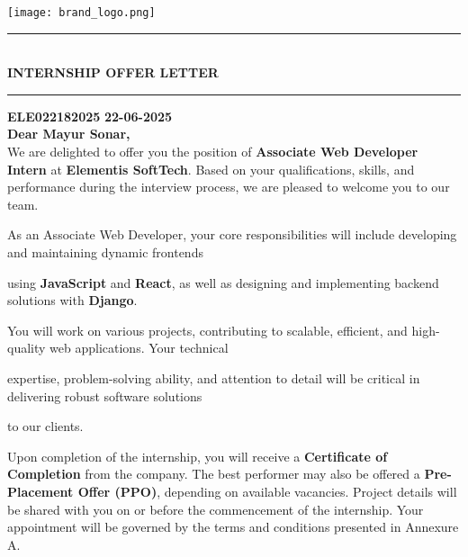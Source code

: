 \documentclass[a4paper,12pt]{article}
\begin{document}
\begin{center}
    \texttt{[image: brand\_logo.png]}\\
\end{center}

\begin{center}
    \vspace{0.5cm}
    \rule{\textwidth}{1pt} \\[0.5cm]
    {\LARGE \textbf{INTERNSHIP OFFER LETTER}} \\[0.5cm]
    \rule{\textwidth}{1pt}
\end{center}

\vspace{0.5cm}

\noindent
\textbf{ELE022182025} \hfill \textbf{22-06-2025} \\[0.5cm]

\noindent
\textbf{Dear Mayur Sonar,} \\

\vspace{0.5cm}
We are delighted to offer you the position of \textbf{Associate Web Developer Intern} at \textbf{Elementis SoftTech}. Based on your qualifications, skills, and performance during the interview process, we are pleased to welcome you to our team.

\vspace{0.5cm}
As an Associate Web Developer, your core responsibilities will include developing and maintaining dynamic frontends 

        using \textbf{JavaScript} and \textbf{React}, as well as designing and implementing backend solutions with \textbf{Django}. 

        You will work on various projects, contributing to scalable, efficient, and high-quality web applications. Your technical 

        expertise, problem-solving ability, and attention to detail will be critical in delivering robust software solutions 

        to our clients.

\vspace{0.5cm}
Upon completion of the internship, you will receive a \textbf{Certificate of Completion} from the company. The best performer may also be offered a \textbf{Pre-Placement Offer (PPO)}, depending on available vacancies. Project details will be shared with you on or before the commencement of the internship. Your appointment will be governed by the terms and conditions presented in Annexure A.
\end{document}
